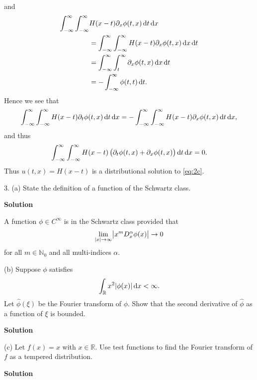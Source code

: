 \documentclass{article}
\begin{document}
%
and
%
\begin{align*}
    \int_{-\infty}^\infty \int_{-\infty}^\infty& H(x - t) \partial_x \phi(t, x) \dif t \dif x \\
        &= \int_{-\infty}^\infty \int_{-\infty}^\infty H(x - t) \partial_x \phi(t, x) \dif x \dif t \\
        &= \int_{-\infty}^\infty \int_t^\infty \partial_x \phi(t, x) \dif x \dif t \\
        &= - \int_{-\infty}^\infty \phi(t, t) \dif t
        .
\end{align*}
%
Hence we see that
%
\begin{equation*}
    \int_{-\infty}^\infty \int_{-\infty}^\infty H(x - t) \partial_t \phi(t, x) \dif t \dif x \\
    = -\int_{-\infty}^\infty \int_{-\infty}^\infty H(x - t) \partial_x \phi(t, x) \dif t \dif x
    ,
\end{equation*}
%
and thus
%
\begin{equation*}
    \int_{-\infty}^\infty \int_{-\infty}^\infty
        H(x - t) \del{\partial_t \phi(t, x) + \partial_x \phi(t, x)}
    \dif t \dif x
    = 0
    .
\end{equation*}
%
Thus $u(t, x) = H(x - t)$ is a distributional solution to \eqref{eq:2c}.

\newpage

3. (a) State the definition of a function of the Schwartz class.

\textbf{Solution}

A function $\phi \in C^\infty$ is in the Schwartz class provided that
%
\begin{equation*}
    \lim_{|x| \to \infty} \envert{x^m D_x^\alpha \phi(x)} \to 0
\end{equation*}
%
for all $m \in \mathbb{N}_0$ and all multi-indices $\alpha$.

\vspace{5mm}

(b) Suppose $\phi$ satisfies
%
\begin{equation*}
    \int_{\mathbb{R}} x^2 |\phi(x)| \dif x < \infty
    .
\end{equation*}
%
Let $\widehat{\phi}(\xi)$ be the Fourier transform of $\phi$. Show that
the second derivative of $\widehat{\phi}$ as a function of $\xi$ is
bounded.

\textbf{Solution}

\vspace{5mm}

(c) Let $f(x) = x$ with $x \in \mathbb{R}$. Use test functions to find
the Fourier transform of $f$ as a tempered distribution.

\textbf{Solution}
\end{document}
